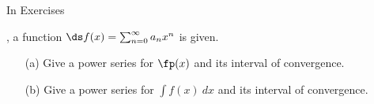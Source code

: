 {\noindent In Exercises}
{, a function $\ds f(x) = \sum_{n=0}^\infty a_nx^n$ is given. 
\begin{enumerate}
	\item [(a)] Give a power series for $\fp(x)$ and its interval of convergence.
	\item [(b)] Give a power series for $\int f(x)\ dx$ and its interval of convergence.
\end{enumerate}
}
